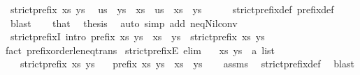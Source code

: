 \begin{isabellebody}
\ {\isacartoucheopen}strict{\isacharunderscore}prefix\ xs\ ys{\isacartoucheclose}\ \isamarkupfalse%
\ us\ \ {\isachardoublequoteopen}ys\ {\isacharequal}\ xs\ {\isacharat}\ us{\isachardoublequoteclose}\ \ {\isachardoublequoteopen}xs\ {\isasymnoteq}\ ys{\isachardoublequoteclose}\isanewline
\ \ \ \ \isamarkupfalse%
\ strict{\isacharunderscore}prefix{\isacharunderscore}def\ prefix{\isacharunderscore}def\ \isamarkupfalse%
\ blast\isanewline
\ \ \isamarkupfalse%
\ that\ \isamarkupfalse%
\ {\isacharquery}thesis\ \isamarkupfalse%
\ {\isacharparenleft}auto\ simp\ add{\isacharcolon}\ neq{\isacharunderscore}Nil{\isacharunderscore}conv{\isacharparenright}\isanewline
{}\isamarkupfalse%
%
\endisatagproof
{\isafoldproof}%
%
\isadelimproof
\isanewline
%
\endisadelimproof
\isanewline
\isanewline
{}\isamarkupfalse%
\ strict{\isacharunderscore}prefixI\ {\isacharbrackleft}intro{\isacharquery}{\isacharbrackright}{\isacharcolon}\ {\isachardoublequoteopen}prefix\ xs\ ys\ {\isasymLongrightarrow}\ xs\ {\isasymnoteq}\ ys\ {\isasymLongrightarrow}\ strict{\isacharunderscore}prefix\ xs\ ys{\isachardoublequoteclose}\isanewline
%
\isadelimproof
%
\endisadelimproof
%
\isatagproof
{}\isamarkupfalse%
{\isacharparenleft}fact\ prefix{\isacharunderscore}order{\isachardot}le{\isacharunderscore}neq{\isacharunderscore}trans{\isacharparenright}%
\endisatagproof
{\isafoldproof}%
%
\isadelimproof
\isanewline
%
\endisadelimproof
\isanewline
{}\isamarkupfalse%
\ strict{\isacharunderscore}prefixE\ {\isacharbrackleft}elim{\isacharquery}{\isacharbrackright}{\isacharcolon}\isanewline
\ \ \ xs\ ys\ {\isacharcolon}{\isacharcolon}\ {\isachardoublequoteopen}{\isacharprime}a\ list{\isachardoublequoteclose}\isanewline
\ \ \ {\isachardoublequoteopen}strict{\isacharunderscore}prefix\ xs\ ys{\isachardoublequoteclose}\isanewline
\ \ \ {\isachardoublequoteopen}prefix\ xs\ ys{\isachardoublequoteclose}\ \ {\isachardoublequoteopen}xs\ {\isasymnoteq}\ ys{\isachardoublequoteclose}\isanewline
%
\isadelimproof
\ \ %
\endisadelimproof
%
\isatagproof
{}\isamarkupfalse%
\ assms\ \isamarkupfalse%
\ strict{\isacharunderscore}prefix{\isacharunderscore}def\ \isamarkupfalse%
\ blast%
\endisatagproof
{\isafoldproof}%
%
\isadelimproof
%
\endisadelimproof
%
\isadelimdocument
%
\endisadelimdocument
%
\isatagdocument

\end{isabellebody}
